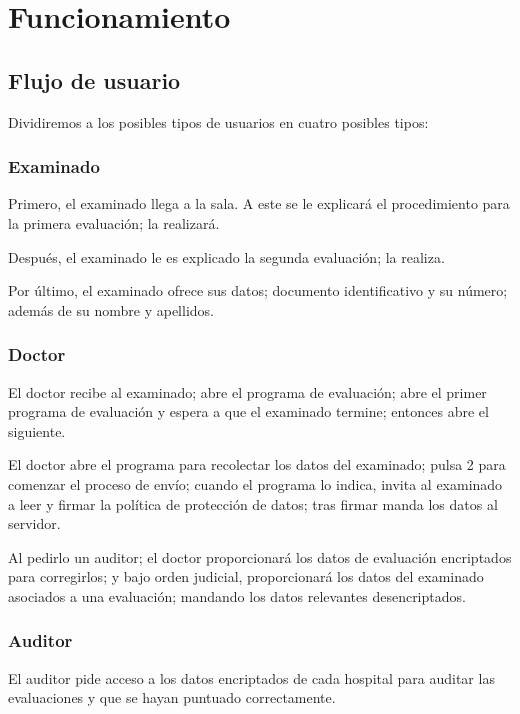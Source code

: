 \documentclass[12pt,a4paper,twoside,openright]{book}
\begin{document}
\chapter{Funcionamiento}

\section{Flujo de usuario}

Dividiremos a los posibles tipos de usuarios en cuatro posibles tipos:

\subsection{Examinado}

Primero, el examinado llega a la sala. A este se le explicará el procedimiento para la primera evaluación; la realizará.

Después, el examinado le es explicado la segunda evaluación; la realiza.

Por último, el examinado ofrece sus datos; documento identificativo y su número; además de su nombre y apellidos.
\subsection{Doctor}

El doctor recibe al examinado; abre el programa de evaluación; abre el primer programa de evaluación y espera a que el examinado termine; entonces abre el siguiente.

El doctor abre el programa para recolectar los datos del examinado; pulsa 2 para comenzar el proceso de envío; cuando el programa lo indica, invita al examinado a leer y firmar la política de protección de datos; tras firmar manda los datos al servidor.

Al pedirlo un auditor; el doctor proporcionará los datos de evaluación encriptados para corregirlos; y bajo orden judicial, proporcionará los datos del examinado asociados a una evaluación; mandando los datos relevantes desencriptados.

\subsection{Auditor}

El auditor pide acceso a los datos encriptados de cada hospital para auditar las evaluaciones y que se hayan puntuado correctamente.
\end{document}
